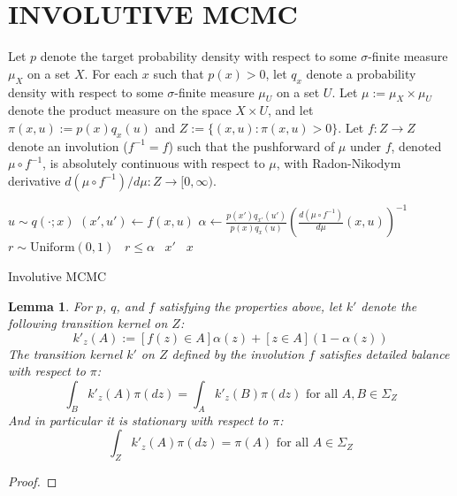 \documentclass[twoside]{article}
\newtheorem{lemma}[theorem]{Lemma}
\begin{document}
\section{INVOLUTIVE MCMC}
Let $p$ denote the target probability density with respect to some $\sigma$-finite measure $\mu_X$ on a set $X$.
For each $x$ such that $p(x) > 0$, let $q_x$ denote a probability density with respect to some $\sigma$-finite measure $\mu_U$ on a set $U$.
Let $\mu := \mu_X \times \mu_U$ denote the product measure on the space $X \times U$, and let $\pi(x, u) := p(x) q_x(u)$ and $Z := \{(x, u) : \pi(x, u) > 0\}$.
Let $f : Z \to Z$ denote an involution ($f^{-1} = f$) such that the pushforward of $\mu$ under $f$, denoted $\mu \circ f^{-1}$, is absolutely continuous with respect to $\mu$, with Radon-Nikodym derivative $d (\mu \circ f^{-1}) / d\mu : Z \to [0, \infty)$.

\begin{algorithm}[h]
\begin{algorithmic}
    \State $u \sim q(\cdot; x)$ 
    \State $(x', u') \gets f(x, u)$ 
    \State $\alpha \gets
        \displaystyle \frac{p(x') q_{x'}(u')}{p(x) q_{x}(u)} \left( \frac{d (\mu \circ f^{-1})}{d \mu} (x, u)\right)^{-1}$
    \State $r \sim \mathrm{Uniform}(0, 1)$
    \State \algorithmicif \, $r \le \alpha$ \algorithmicthen \, \Return $x'$ \algorithmicelse \, \Return $x$ 
\EndProcedure
\end{algorithmic}
\caption{Involutive MCMC}
\label{alg:involutive-mcmc}
\end{algorithm}

\begin{lemma}\label{lemma:involution-detailed-balance} %
For $p$, $q$, and $f$ satisfying the properties above, let $k'$ denote the following transition kernel on $Z$:
\[
k'_z(A) := [f(z) \in A] \alpha(z) + [z \in A](1 - \alpha(z))
\]
The transition kernel $k'$ on $Z$ defined by the involution $f$ satisfies detailed balance with respect to $\pi$:
\[
\int_B k'_z(A) \pi(dz) = \int_A k'_z(B) \pi(dz) \mbox{ for all } A, B \in \Sigma_Z
\]
And in particular it is stationary with respect to $\pi$:
\[
\int_Z k'_z(A) \pi(dz) = \pi(A) \mbox{ for all } A \in \Sigma_Z
\]
\end{lemma}
\begin{proof}
\end{proof}
\end{document}
